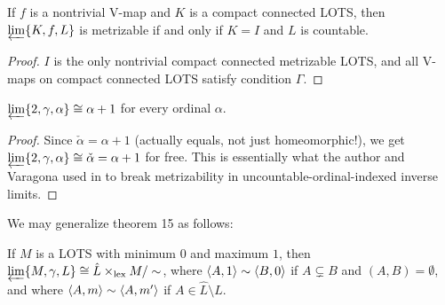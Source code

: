 \documentclass[11pt]{article}
\newcommand{\lexTimes}{\times_{\textrm{lex}}}
\begin{document}
  \begin{corollary}
    If \(f\) is a nontrivial V-map
    and \(K\) is a compact connected LOTS, then
    \(\varprojlim \{K, f, L\}\) is metrizable if and only if
    \(K=I\) and \(L\) is countable.
  \end{corollary}

  \begin{proof}
    \(I\) is the only nontrivial compact connected metrizable LOTS, and all V-maps
    on compact connected LOTS satisfy condition \(\Gamma\).
  \end{proof}

  \begin{corollary}
    \(
      \varprojlim \{2, \gamma, \alpha\}
      \cong
      \alpha+1
    \)
    for every ordinal \(\alpha\).
  \end{corollary}

  \begin{proof}
    Since \(\check\alpha=\alpha+1\) (actually equals, not just homeomorphic!),
    we get \(\varprojlim \{2, \gamma, \alpha\}
      \cong \check\alpha =
    \alpha+1\) for free.
    This is essentially what the author and Varagona used
    in \cite{CLONTZVARAGONA} to break
    metrizability in uncountable-ordinal-indexed inverse limits.
  \end{proof}

  \bigskip

  We may generalize theorem 15 as follows:

  \begin{theorem}
    If \(M\) is a LOTS with minimum \(0\) and maximum \(1\),
    then \(\varprojlim\{M,\gamma,L\}\cong \hat L\lexTimes M/\sim\),
    where \(\langle A,1\rangle\sim\langle B,0\rangle\) if
    \(A\subsetneq B\) and \((A,B)=\emptyset\),
    and where \(\langle A,m\rangle\sim\langle A,m'\rangle\) if \(A\in\hat L\setminus L\).
  \end{theorem}
\end{document}
